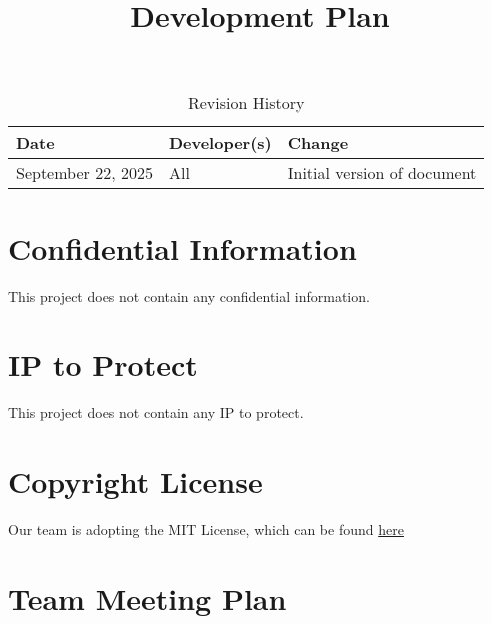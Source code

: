 \documentclass{article}
\title{Development Plan\\\progname}
\author{\authname}
\date{}
\begin{document}
\maketitle

\begin{table}[hp]
\caption{Revision History} \label{TblRevisionHistory}
\begin{tabularx}{\textwidth}{llX}
\toprule
\textbf{Date} & \textbf{Developer(s)} & \textbf{Change}\\
\midrule
September 22, 2025 & All & Initial version of document\\
\bottomrule
\end{tabularx}
\end{table}

\newpage{}



\section{Confidential Information}

This project does not contain any confidential information.


\section{IP to Protect}
This project does not contain any IP to protect. 
\section{Copyright License}

Our team is adopting the MIT License, which can be found \href{https://github.com/4G06-CAPSTONE-2025/Reading4All/blob/main/LICENSE} {here}

\section{Team Meeting Plan}
\end{document}

